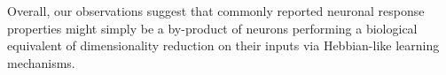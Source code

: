 
Overall, our observations suggest that 
commonly reported neuronal response properties might simply be a 
by-product of neurons performing a biological equivalent of 
dimensionality reduction on their inputs 
via Hebbian-like learning mechanisms.






